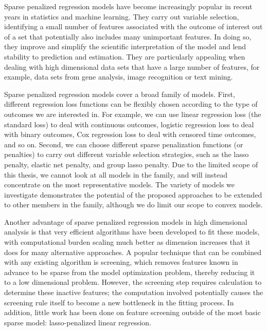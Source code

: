 \label{intro}

Sparse penalized regression models have become increasingly popular in recent years in statistics and machine learning. They carry out variable selection, identifying a small number of features associated with the outcome of interest out of a set that potentially also includes many unimportant features. In doing so, they improve and simplify the scientific interpretation of the model and lend stability to prediction and estimation. They are particularly appealing when dealing with high dimensional data sets that have a large number of features, for example, data sets from gene analysis, image recognition or text mining. 

Sparse penalized regression models cover a broad family of models. First, different regression loss functions can be flexibly chosen according to the type of outcomes we are interested in. For example, we can use linear regression loss (the standard loss) to deal with continuous outcomes, logistic regression loss to deal with binary outcomes, Cox regression loss to deal with censored time outcomes, and so on. Second, we can choose different sparse penalization functions (or penalties) to carry out different variable selection strategies, such as the lasso penalty, elastic net penalty, and group lasso penalty. Due to the limited scope of this thesis, we cannot look at all models in the family, and will instead concentrate on the most representative models. The variety of models we investigate demonstrates the potential of the proposed approaches to be extended to other members in the family, although we do limit our scope to convex models. 

Another advantage of sparse penalized regression models in high dimensional analysis is that very efficient algorithms have been developed to fit these models, with computational burden scaling much better as dimension increases that it does for many alternative approaches. A popular technique that can be combined with any existing algorithm is screening, which removes features known in advance to be sparse from the model optimization problem, thereby reducing it to a low dimensional problem. However, the screening step requires calculation to determine these inactive features; the computation involved potentially causes the screening rule itself to become a new bottleneck in the fitting process. In addition, little work has been done on feature screening outside of the most basic sparse model: lasso-penalized linear regression.


